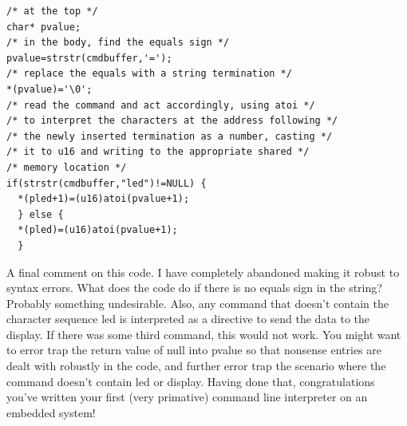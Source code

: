 \documentclass[../physical_computing.tex]{subfiles}
\begin{document}
\begin{verbatim}
/* at the top */
char* pvalue;
/* in the body, find the equals sign */
pvalue=strstr(cmdbuffer,'=');
/* replace the equals with a string termination */
*(pvalue)='\0';
/* read the command and act accordingly, using atoi */
/* to interpret the characters at the address following */
/* the newly inserted termination as a number, casting */
/* it to u16 and writing to the appropriate shared */
/* memory location */
if(strstr(cmdbuffer,"led")!=NULL) {
  *(pled+1)=(u16)atoi(pvalue+1);
  } else {
  *(pled)=(u16)atoi(pvalue+1);
  }
\end{verbatim}

A final comment on this code. I have completely abandoned making it robust to syntax errors. What does the
code do if there is no equals sign in the string? Probably something undesirable. Also, any command that doesn't
contain the character sequence led is interpreted as a directive to send the data to the display. If there was
some third command, this would not work. You might want to error
trap the return value of null into pvalue so that nonsense entries are dealt with robustly in the code, and
further error trap the scenario where the command doesn't contain led or display.
Having done that, congratulations you've written your first (very primative) command line interpreter on
an embedded system!
\end{document}
